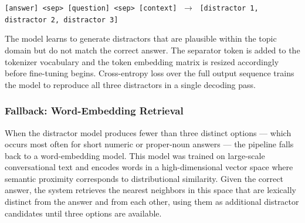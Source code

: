\begin{center}
\texttt{[answer] \textless sep\textgreater\ [question] \textless sep\textgreater\ [context]} $\;\longrightarrow\;$ \texttt{[distractor 1, distractor 2, distractor 3]}
\end{center}

The model learns to generate distractors that are plausible within the topic domain but do not match the correct answer. The separator token is added to the tokenizer vocabulary and the token embedding matrix is resized accordingly before fine-tuning begins. Cross-entropy loss over the full output sequence trains the model to reproduce all three distractors in a single decoding pass.

\subsubsection{Fallback: Word-Embedding Retrieval}

When the distractor model produces fewer than three distinct options — which occurs most often for short numeric or proper-noun answers — the pipeline falls back to a word-embedding model. This model was trained on large-scale conversational text and encodes words in a high-dimensional vector space where semantic proximity corresponds to distributional similarity. Given the correct answer, the system retrieves the nearest neighbors in this space that are lexically distinct from the answer and from each other, using them as additional distractor candidates until three options are available.
